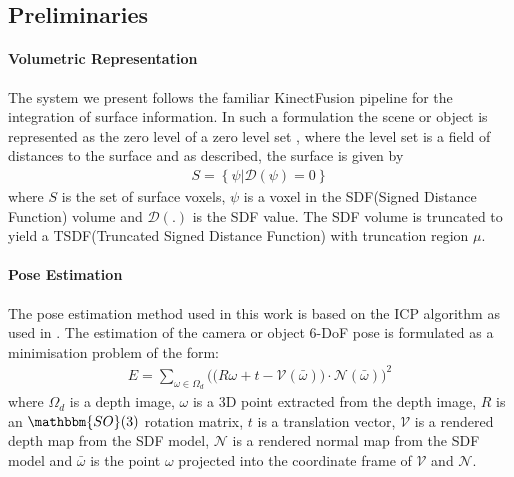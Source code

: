 
\iffalse
\subsection{Preliminaries}
\paragraph{Volumetric Representation}
The system we present follows the familiar KinectFusion \cite{Newcombe2011} pipeline for the integration of surface information. In such a 
formulation the scene or object is represented as the zero level of a zero level set \cite{Curless1996}, where the level set is a field of distances 
to the surface and as described, the surface is given by
\begin{equation}
\begin{split}
S = \left\{\psi | \mathcal{D}(\psi) = 0\right\}
\end{split}
\end{equation}
where $S$ is the set of surface voxels, $\psi$ is a voxel in the SDF(Signed Distance Function) volume and $\mathcal{D}(.)$ is the SDF value. 
The SDF volume is truncated to yield a TSDF(Truncated Signed Distance Function) with truncation region $\mu$.

\paragraph{Pose Estimation}
The pose estimation method used in this work is based on the ICP algorithm as used in \cite{Newcombe2011, Prisacariu2014}. The estimation of 
the camera or object 6-DoF pose is formulated as a minimisation problem of the form:
\begin{equation}
\begin{split}
E = \sum_{\omega \in \Omega_{d}} \bigg( \big( R\omega + t - \mathcal{V}(\bar{\omega}) \big) \cdot \mathcal{N}(\bar{\omega}) \bigg)^{2}
\end{split}
\end{equation}
where $\Omega_{d}$ is a depth image, $\omega$ is a 3D point extracted from the depth image, $R$ is an  $\mathbbm{SO}(3)$ 
rotation matrix, $t$ is a translation vector, $\mathcal{V}$ is a rendered depth map from the SDF model, $\mathcal{N}$ is a rendered 
normal map from the SDF model and $\bar{\omega}$ is the point $\omega$ projected into the coordinate frame of $\mathcal{V}$ and 
$\mathcal{N}$.

